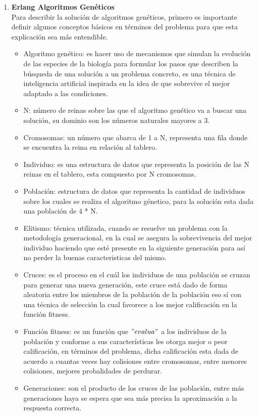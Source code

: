 \documentclass[12pt,a4paper]{article}
\begin{document}
\begin{enumerate}
\pagebreak
\item  \textbf{Erlang Algoritmos Genéticos} \\

Para describir la solución de algoritmos genéticos, primero es importante definir algunos conceptos básicos en términos del problema para que esta explicación sea más entendible. 
\begin{itemize}
\item Algoritmo genético: es hacer uso de mecanismos que simulan la evolución de las especies de la biología para formular los pasos que describen la búsqueda de una solución a un problema concreto, es una técnica de inteligencia artificial inspirada en la idea de que sobrevive el mejor adaptado a las condiciones.
\item N: número de reinas sobre las que el algoritmo genético va a buscar una solución, su dominio son los números naturales mayores a 3.
\item Cromosomas: un número que abarca de 1 a N, representa una fila donde se encuentra la reina en relación al tablero.
\item Individuo: es una estructura de datos que representa la posición de las N reinas en el tablero, esta compuesto por N cromosomas.
\item Población: estructura de datos que representa la cantidad de individuos sobre los cuales se realiza el algoritmo génetico, para la solución esta dada una población de 4 * N.
\item Elitismo: técnica utilizada, cuando se resuelve un problema con la metodología generacional, en la cual se asegura la sobrevivencia del mejor individuo haciendo que esté presente en la siguiente generación para así no perder la buenas caracteristicas del mismo. 
\item Cruces: es el proceso en el cuál los individuos de una población se cruzan para generar una nueva generación, este cruce está dado de forma aleatoria entre los miembros de la población de la población eso sí con una técnica de selección la cual favorece a los mejor calificación en la función fitness.
\item Función fitness: es un función que $"evalua"$ a los individuos de la población y conforme a sus características les otorga mejor o peor calificación, en términos del problema, dicha calificación esta dada de acuerdo a cuantas veces hay colisiones entre cromosomas, entre menores colisiones, mejores probalidades de perdurar. 
\item Generaciones: son el producto de los cruces de las población, entre más generaciones haya se espera que sea más precisa la aproximación a la respuesta correcta.

\end{itemize}
\end{enumerate}
\end{document}
